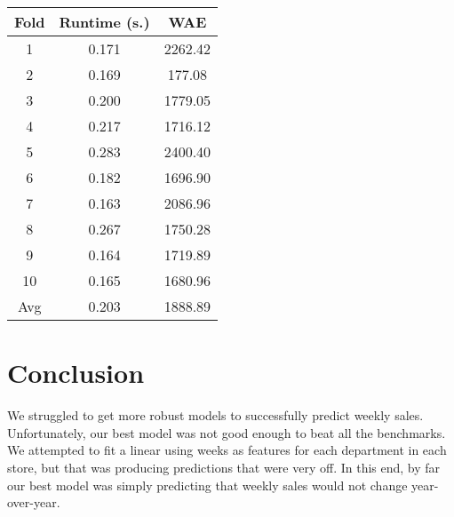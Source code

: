 \documentclass{article}
\begin{document}
\begin{center}
    \begin{tabular}{|c|c|c|}
        \hline
        Fold & Runtime (s.) & WAE \\ 
        \hline \hline 
        1 & 0.171 & 2262.42 \\ 
        \hline
        2 & 0.169 & 177.08 \\ 
        \hline
        3 & 0.200 & 1779.05 \\ 
        \hline
        4 & 0.217 & 1716.12 \\ 
        \hline
        5 & 0.283 & 2400.40 \\ 
        \hline
        6 & 0.182 & 1696.90 \\ 
        \hline
        7 & 0.163 & 2086.96 \\ 
        \hline
        8 & 0.267 & 1750.28 \\ 
        \hline
        9 & 0.164 & 1719.89 \\ 
        \hline
        10 & 0.165 & 1680.96 \\ 
        \hline
        Avg & 0.203 & 1888.89 \\ 
        \hline 
    \end{tabular}
\end{center}


\section{Conclusion}

We struggled to get more robust models to successfully predict weekly sales. Unfortunately, our best model was not good enough to beat all the benchmarks. We attempted to fit a linear using weeks as features for each department in each store, but that was producing predictions that were very off. In this end, by far our best model was simply predicting that weekly sales would not change year-over-year. 
\end{document}
